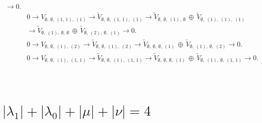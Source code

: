 \documentclass[openany, a4paper]{amsbook}
\theoremstyle{definition}
\numberwithin{equation}{chapter}
\begin{document}
\begin{align*}
\to 0.
\\ &
0 \to 
V_{ \emptyset, \ \emptyset, \ (1,\,1), \ (1) }\to
\tilde{V}_{ \emptyset, \ \emptyset, \ (1,\,1), \ (1) }
\to
\tilde{V}_{ \emptyset, \ \emptyset, \ (1), \ \emptyset }\,\oplus\,\tilde{V}_{ \emptyset, \ (1), \ (1), \ (1) } \\ &
\to
\tilde{V}_{ \emptyset, \ (1), \ \emptyset, \ \emptyset }\,\oplus\,\tilde{V}_{ \emptyset, \ (2), \ \emptyset, \ (1) }
\to 0.
\\ &
0 \to 
V_{ \emptyset, \ \emptyset, \ (1), \ (2) }\to
\tilde{V}_{ \emptyset, \ \emptyset, \ (1), \ (2) }
\to
\tilde{V}_{ \emptyset, \ \emptyset, \ \emptyset, \ (1) }\,\oplus\,\tilde{V}_{ \emptyset, \ (1), \ \emptyset, \ (2) }
\to 0.
\\ &
0 \to 
V_{ \emptyset, \ \emptyset, \ (1), \ (1,\,1) }\to
\tilde{V}_{ \emptyset, \ \emptyset, \ (1), \ (1,\,1) }
\to
\tilde{V}_{ \emptyset, \ \emptyset, \ \emptyset, \ (1) }\,\oplus\,\tilde{V}_{ \emptyset, \ (1), \ \emptyset, \ (1,\,1) }
\to 0.
\end{align*}

$\quad$

\pagebreak
\section{$ |\lambda_1| + |\lambda_0| + |\mu| + |\nu| = 4$}

$\quad$
\end{document}
